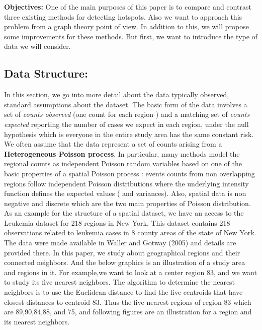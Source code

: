 \documentclass[12pt]{article}
\begin{document}
			\textbf{Objectives:} One of the main purposes of this paper is to compare and contrast three existing methods for detecting hotspots. Also we want to approach this problem from a graph theory point of view. In addition to this, we will propose some improvements for these methods. But first, we want to introduce the type of data we will consider. \\
				
		\subsection{Data Structure:} 
			In this section, we go into more detail about the data typically observed, standard assumptions about the dataset. 
			The basic form of the data involves a set of \textit{counts observed} (one count for each region ) and a matching set of \textit{counts expected} reporting the number of cases we expect in each region, under the null hypothesis which is everyone in the entire study area has the same constant risk. \\
			
We often assume that the data represent a set of counts arising from a \textbf{Heterogeneous Poisson process}.
In particular, many methods model the regional counts as independent Poisson random variables based on one of the basic properties of a spatial Poisson process : events counts from non overlapping regions follow independent Poisson distributions where the underlying intensity function defines the expected values ( and variances). Also, spatial data is non negative and discrete which are the two main properties of Poisson distribution. \\
			 
			
			
			As an example for the structure of a spatial dataset, we have an access to the Leukemia dataset for 218 regions in New York. This dataset contains 218 observations related to leukemia cases in 8 county areas of the state of New York. The data were made available in Waller and Gotway (2005) and details are provided there. In this paper, we study about geographical regions and their connected neighbors. And 			
the below graphics is an illustration of a study area and regions in it. For example,we want to look at a center region 83, and we want to study its five nearest neighbors. The algorithm to determine the nearest neighbors is to use the Euclidean distance to find the five centroids that have closest distances to centroid 83. Thus the five nearest regions of region 83 which are 89,90,84,88, and 75, and following figures are an illustration for a region and its nearest neighbors. \\	
			
\end{document}
